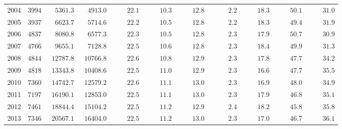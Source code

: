 \begin{table}[ht]
{\begin{tabular}{lcccccccccc}
2004  & $3994$ & $\phantom{00}5361.3$ & $\phantom{00}4913.0$ & $\phantom{0000}22.1$ & $\phantom{0000}10.3$ & $\phantom{0000}12.8$ & $\phantom{00000}2.2$ & $\phantom{0000}18.3$ & $\phantom{0000}50.1$ & $\phantom{0000}31.0$ \\
2005  & $3937$ & $\phantom{00}6623.7$ & $\phantom{00}5714.6$ & $\phantom{0000}22.2$ & $\phantom{0000}10.5$ & $\phantom{0000}12.8$ & $\phantom{00000}2.2$ & $\phantom{0000}18.3$ & $\phantom{0000}49.4$ & $\phantom{0000}31.9$ \\
2006  & $4837$ & $\phantom{00}8080.8$ & $\phantom{00}6577.3$ & $\phantom{0000}22.3$ & $\phantom{0000}10.5$ & $\phantom{0000}12.8$ & $\phantom{00000}2.3$ & $\phantom{0000}17.9$ & $\phantom{0000}50.7$ & $\phantom{0000}30.9$ \\
2007  & $4766$ & $\phantom{00}9655.1$ & $\phantom{00}7128.8$ & $\phantom{0000}22.5$ & $\phantom{0000}10.6$ & $\phantom{0000}12.8$ & $\phantom{00000}2.3$ & $\phantom{0000}18.4$ & $\phantom{0000}49.9$ & $\phantom{0000}31.3$ \\
2008  & $4844$ & $\phantom{0}12787.8$ & $\phantom{0}10766.8$ & $\phantom{0000}22.6$ & $\phantom{0000}10.8$ & $\phantom{0000}12.9$ & $\phantom{00000}2.3$ & $\phantom{0000}17.8$ & $\phantom{0000}47.7$ & $\phantom{0000}34.2$ \\
2009  & $4818$ & $\phantom{0}13343.8$ & $\phantom{0}10408.6$ & $\phantom{0000}22.5$ & $\phantom{0000}11.0$ & $\phantom{0000}12.9$ & $\phantom{00000}2.3$ & $\phantom{0000}16.6$ & $\phantom{0000}47.7$ & $\phantom{0000}35.5$ \\
2010  & $7360$ & $\phantom{0}14742.7$ & $\phantom{0}12579.2$ & $\phantom{0000}22.6$ & $\phantom{0000}11.1$ & $\phantom{0000}13.0$ & $\phantom{00000}2.3$ & $\phantom{0000}16.9$ & $\phantom{0000}48.0$ & $\phantom{0000}34.9$ \\
2011  & $7197$ & $\phantom{0}16190.1$ & $\phantom{0}12853.0$ & $\phantom{0000}22.5$ & $\phantom{0000}11.1$ & $\phantom{0000}13.0$ & $\phantom{00000}2.3$ & $\phantom{0000}17.9$ & $\phantom{0000}46.8$ & $\phantom{0000}35.1$ \\
2012  & $7461$ & $\phantom{0}18844.4$ & $\phantom{0}15104.2$ & $\phantom{0000}22.5$ & $\phantom{0000}11.2$ & $\phantom{0000}12.9$ & $\phantom{00000}2.4$ & $\phantom{0000}18.2$ & $\phantom{0000}45.8$ & $\phantom{0000}35.8$ \\
2013  & $7346$ & $\phantom{0}20567.1$ & $\phantom{0}16404.0$ & $\phantom{0000}22.5$ & $\phantom{0000}11.2$ & $\phantom{0000}13.0$ & $\phantom{00000}2.3$ & $\phantom{0000}17.0$ & $\phantom{0000}46.7$ & $\phantom{0000}36.1$ \\

\end{tabular}}
\end{table}
